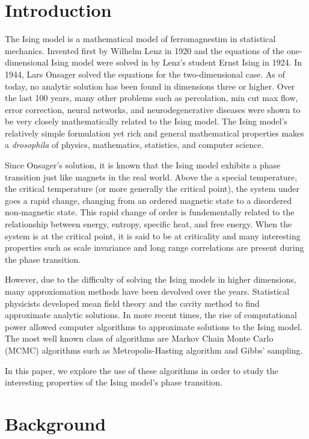 \documentclass{article}
\begin{document}
\section{Introduction}
\label{Introduction}
    The Ising model is a mathematical model of ferromagnestim in statistical mechanics.
    Invented first by Wilhelm Lenz in 1920 and the equations of the one-dimensional Ising model were solved in by
    Lenz's student Ernst Ising in 1924. In 1944, Lars Onsager solved the equations for the two-dimensional case. 
    As of today, no analytic solution has been found in dimensions three or higher. Over the last 100 years, many other problems such as percolation, min cut max flow, error correction, neural networks, and neurodegenerative diseases were
    shown to be very closely mathematically related to the Ising model. 
    The Ising model's relatively simple formulation yet rich and general mathematical properties makes a \textit{drosophila} of physics, mathematics, statistics, and computer science.

    Since Onsager's solution, it is known that the Ising model exhibits a phase transition just like magnets in the real world. Above the
    a special temperature, the critical temperature (or more generally the critical point), the system under goes a rapid change, changing from an ordered magnetic state to a disordered non-magnetic state. 
    This rapid change of order is fundementally related to the relationship between energy, entropy, specific heat, and free energy. When the system is at the critical point, it is said to be at
    criticality and many interesting properties such as scale invariance and long range correlations are present
    during the phase transition. 

    However, due to the difficulty of solving the Ising models in higher dimensions, many approxiomation methods have been devolved over the years. 
    Statistical physicists developed mean field theory and the cavity method to find approximate analytic solutions. In more recent times, the rise of computational 
    power allowed computer algorithms to approximate solutions to the Ising model. The most well known class of algorithms are Markov Chain Monte Carlo (MCMC) algorithms such as 
    Metropolis-Hasting algorithm and Gibbs' sampling. 
    
    In this paper, we explore the use of these algorithms in order to study the interesting properties of the Ising model's phase transition.


\section{Background}
\label{Mathematical Background}
\end{document}

